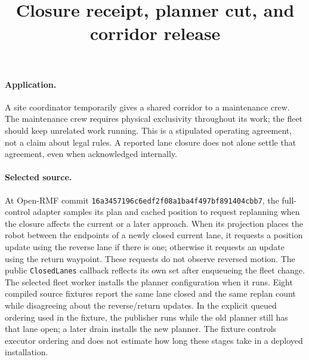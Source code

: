 \documentclass{article}
\begin{document}
\title{Closure receipt, planner cut, and corridor release}
\maketitle

\paragraph{Application.}
A site coordinator temporarily gives a shared corridor to a maintenance crew.
The maintenance crew requires physical exclusivity throughout its work; the
fleet should keep unrelated work running. This is a stipulated operating
agreement, not a claim about legal rules. A reported lane closure does not
alone settle that agreement, even when acknowledged internally.

\paragraph{Selected source.}
At Open-RMF commit
\texttt{16a3457196c6edf2f08a1ba4f497bf891404cbb7}, the full-control adapter
samples its plan and cached position to request replanning when the closure
affects the current or a later approach. When its projection places the
robot between the endpoints of a newly closed current lane, it requests a
position update using the reverse lane if there is one; otherwise it requests an
update using the return waypoint. These requests do not observe reversed
motion. The public \texttt{ClosedLanes} callback reflects its own set after
enqueueing the fleet change. The selected fleet worker installs the planner
configuration when it runs. Eight compiled source fixtures report the same lane
closed and the same replan count while disagreeing about the reverse/return
updates. In the explicit queued ordering used in the fixture, the publisher
runs while the old planner still has that lane open; a later drain installs the
new planner. The fixture controls executor ordering and does not estimate how
long these stages take in a deployed installation.
\end{document}
